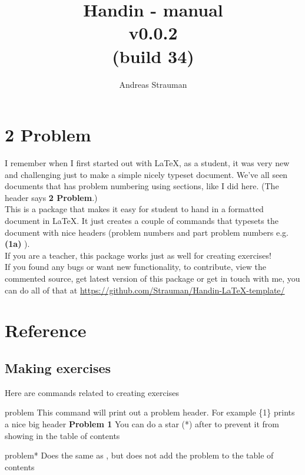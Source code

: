 \documentclass{article}
\title{{Handin - manual\\ v0.0.2{\\[-0.5em]\footnotesize(build 34)}}}
\author{Andreas Strauman}
\let\dac\docAuxCommand
\begin{document}
\maketitle
\section*{2 Problem}
I remember when I first started out with LaTeX, as a student, it was very new and challenging just to make a simple nicely typeset document. We've all seen documents that has problem numbering using sections, like I did here. (The header says \textbf{2 Problem}.)\\

This is a package that makes it easy for student to hand in a formatted document in LaTeX. It just creates a couple of commands that typesets the document with nice headers (problem numbers and part problem numbers e.g. \textbf{(1a)} ).\\

If you are a teacher, this package works just as well for creating exercises!\\
 
If you found any bugs or want new functionality, to contribute, view the commented source, get latest version of this package or get in touch with me, you can do all of that at \url{https://github.com/Strauman/Handin-LaTeX-template/}
\tableofcontents
\clearpage
 \section{Reference}
\subsection{Making exercises}
 Here are commands related to creating exercises


\begin{docCommand}[]{problem}{}
 This command will print out a problem header. For example \dac{problem}\{1\}
 prints a nice big header \textbf{Problem 1} You can do a star (*) after \dac{problem} to
 prevent it from showing in the table of contents

\end{docCommand}

\begin{docCommand}[]{problem*}{}
 Does the same as \dac{problem}, but does not add the problem to the table of contents

\end{docCommand}
\end{document}
